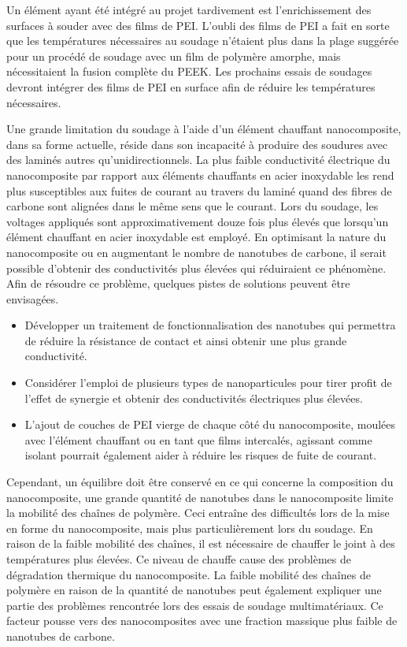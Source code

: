 Un élément ayant été intégré au projet tardivement est l'enrichissement des surfaces à souder avec des films de PEI. 
L'oubli des films de PEI a fait en sorte que les températures nécessaires au soudage n'étaient plus dans la plage suggérée pour un procédé de soudage avec un film de polymère amorphe, mais nécessitaient la fusion complète du PEEK. 
Les prochains essais de soudages devront intégrer des films de PEI en surface afin de réduire les températures nécessaires.  

Une grande limitation du soudage à l'aide d'un élément chauffant nanocomposite, dans sa forme actuelle, réside dans son incapacité à produire des soudures avec des laminés autres qu'unidirectionnels. 
La plus faible conductivité électrique du nanocomposite par rapport aux éléments chauffants en acier inoxydable les rend plus susceptibles aux fuites de courant au travers du laminé quand des fibres de carbone sont alignées dans le même sens que le courant. 
Lors du soudage, les voltages appliqués sont approximativement douze fois plus élevés que lorsqu'un élément chauffant en acier inoxydable est employé. 
En optimisant la nature du nanocomposite ou en augmentant le nombre de nanotubes de carbone, il serait possible d'obtenir des conductivités plus élevées qui réduiraient ce phénomène. 
Afin de résoudre ce problème, quelques pistes de solutions peuvent être envisagées. 

\begin{itemize}
	\item Développer un traitement de fonctionnalisation des nanotubes qui permettra de réduire la résistance de contact et ainsi obtenir une plus grande conductivité.  
	\item Considérer l'emploi de plusieurs types de nanoparticules pour tirer profit de l'effet de synergie et obtenir des conductivités électriques plus élevées. 
	\item L'ajout de couches de PEI vierge de chaque côté du nanocomposite, moulées avec l'élément chauffant ou en tant que films intercalés, agissant comme isolant pourrait également aider à réduire les risques de fuite de courant. 
\end{itemize}

Cependant, un équilibre doit être conservé en ce qui concerne la composition du nanocomposite, une grande quantité de nanotubes dans le nanocomposite limite la mobilité des chaînes de polymère. 
Ceci entraîne des difficultés lors de la mise en forme du nanocomposite, mais plus particulièrement lors du soudage.
En raison de la faible mobilité des chaînes, il est nécessaire de chauffer le joint à des températures plus élevées. 
Ce niveau de chauffe cause des problèmes de dégradation thermique du nanocomposite. 
La faible mobilité des chaînes de polymère en raison de la quantité de nanotubes peut également expliquer une partie des problèmes rencontrée lors des essais de soudage multimatériaux. 
Ce facteur pousse vers des nanocomposites avec une fraction massique plus faible de nanotubes de carbone. 

